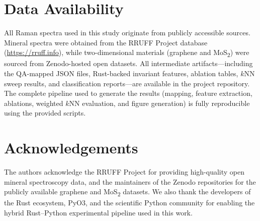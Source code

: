 \documentclass[12pt]{article}
\begin{document}
\section*{Data Availability}

All Raman spectra used in this study originate from publicly accessible sources. Mineral spectra were
obtained from the RRUFF Project database (\url{https://rruff.info}), while two-dimensional materials
(graphene and MoS\textsubscript{2}) were sourced from Zenodo-hosted open datasets. All intermediate
artifacts—including the QA-mapped JSON files, Rust-backed invariant features, ablation tables, 
$k$NN sweep results, and classification reports—are available in the project repository. The complete
pipeline used to generate the results (mapping, feature extraction, ablations, weighted $k$NN evaluation,
and figure generation) is fully reproducible using the provided scripts.

\section*{Acknowledgements}

The authors acknowledge the RRUFF Project for providing high-quality open mineral spectroscopy data, and
the maintainers of the Zenodo repositories for the publicly available graphene and MoS\textsubscript{2}
datasets. We also thank the developers of the Rust ecosystem, PyO3, and the scientific Python community
for enabling the hybrid Rust–Python experimental pipeline used in this work.
\end{document}

